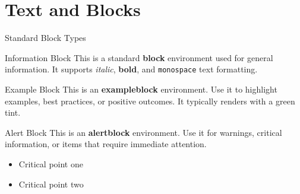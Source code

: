 \section{Text and Blocks}

\begin{frame}{Standard Block Types}
  \begin{block}{Information Block}
    \scriptsize
    This is a standard \textbf{block} environment used for general information.
    It supports \textit{italic}, \textbf{bold}, and \texttt{monospace} text formatting.
  \end{block}

  \vspace{0.2cm}

  \begin{exampleblock}{Example Block}
    \scriptsize
    This is an \textbf{exampleblock} environment. Use it to highlight examples,
    best practices, or positive outcomes. It typically renders with a green tint.
  \end{exampleblock}

  \vspace{0.2cm}

  \begin{alertblock}{Alert Block}
    \scriptsize
    This is an \textbf{alertblock} environment. Use it for warnings, critical
    information, or items that require immediate attention.
    \begin{itemize}
      \item Critical point one
      \item Critical point two
    \end{itemize}
  \end{alertblock}
\end{frame}

